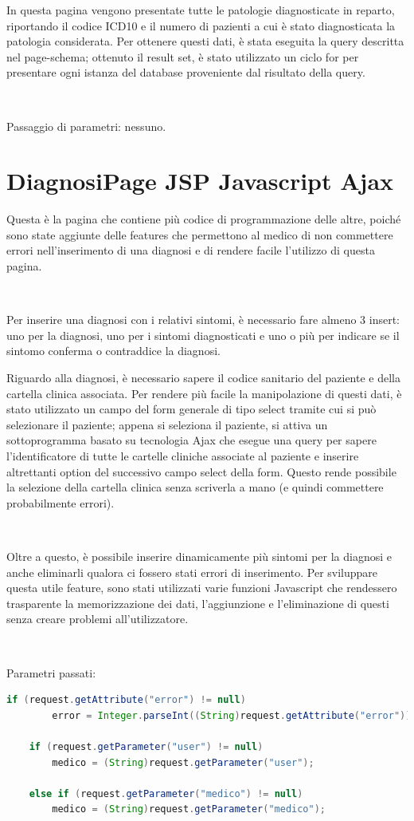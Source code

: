 \documentclass[a4paper,titlepage]{article}
\begin{document}
In questa pagina vengono presentate tutte le patologie diagnosticate in reparto, riportando il codice ICD10 e il numero di pazienti a cui è stato diagnosticata la patologia considerata. Per ottenere questi dati, è stata eseguita la query descritta nel page-schema; ottenuto il result set, è stato utilizzato un ciclo for per presentare ogni istanza del database proveniente dal risultato della query.

~

Passaggio di parametri: nessuno.


\section{DiagnosiPage JSP Javascript Ajax} 

Questa è la pagina che contiene più codice di programmazione delle altre, poiché sono state aggiunte delle features che permettono al medico di non commettere errori nell'inserimento di una diagnosi e di rendere facile l'utilizzo di questa pagina.

~

Per inserire una diagnosi con i relativi sintomi, è necessario fare almeno 3 insert: uno per la diagnosi, uno per i sintomi diagnosticati e uno o più per indicare se il sintomo conferma o contraddice la diagnosi.

Riguardo alla diagnosi, è necessario sapere il codice sanitario del paziente e della cartella clinica associata.
Per rendere più facile la manipolazione di questi dati, è stato utilizzato un campo del form generale di tipo select tramite cui si può selezionare il paziente; appena si seleziona il paziente, si attiva un sottoprogramma basato su tecnologia Ajax che esegue una query per sapere l'identificatore di tutte le cartelle cliniche associate al paziente e inserire altrettanti option del successivo campo select della form. Questo rende possibile la selezione della cartella clinica senza scriverla a mano (e quindi commettere probabilmente errori).

~

Oltre a questo, è possibile inserire dinamicamente più sintomi per la diagnosi e anche eliminarli qualora ci fossero stati errori di inserimento. Per sviluppare questa utile feature, sono stati utilizzati varie funzioni Javascript che rendessero trasparente la memorizzazione dei dati, l'aggiunzione e l'eliminazione di questi senza creare problemi all'utilizzatore. 

~

Parametri passati: 
\begin{lstlisting}[language=java]
    if (request.getAttribute("error") != null)
    	error = Integer.parseInt((String)request.getAttribute("error"));
    
    if (request.getParameter("user") != null)
	    medico = (String)request.getParameter("user");

    else if (request.getParameter("medico") != null)
	    medico = (String)request.getParameter("medico");
\end{lstlisting}
\end{document}
